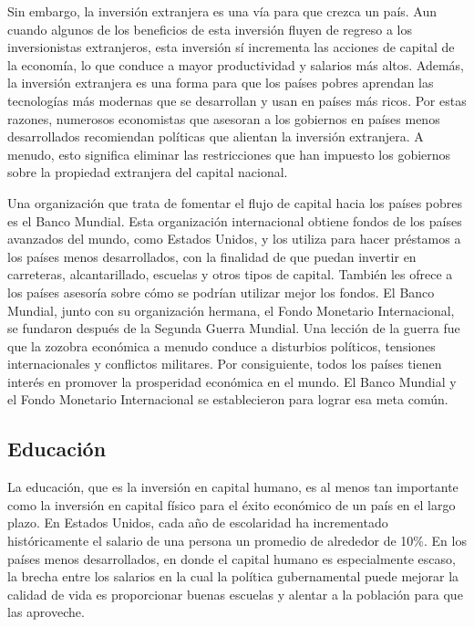 \documentclass[
]{krantz}
\begin{document}
Sin embargo, la inversión extranjera es una vía para que crezca un país. Aun cuando algunos de los beneficios de esta inversión fluyen de regreso a los inversionistas extranjeros, esta inversión sí incrementa las acciones de capital de la economía, lo que conduce a mayor productividad y salarios más altos. Además, la inversión extranjera es una forma para que los países pobres aprendan las tecnologías más modernas que se desarrollan y usan en países más ricos. Por estas razones, numerosos economistas que asesoran a los gobiernos en países menos desarrollados recomiendan políticas que alientan la inversión extranjera. A menudo, esto significa eliminar las restricciones que han impuesto los gobiernos sobre la propiedad extranjera del capital nacional.

Una organización que trata de fomentar el flujo de capital hacia los países pobres es el Banco Mundial. Esta organización internacional obtiene fondos de los países avanzados del mundo, como Estados Unidos, y los utiliza para hacer préstamos a los países menos desarrollados, con la finalidad de que puedan invertir en carreteras, alcantarillado, escuelas y otros tipos de capital. También les ofrece a los países asesoría sobre cómo se podrían utilizar mejor los fondos. El Banco Mundial, junto con su organización hermana, el Fondo Monetario Internacional, se fundaron después de la Segunda Guerra Mundial. Una lección de la guerra fue que la zozobra económica a menudo conduce a disturbios políticos, tensiones internacionales y conflictos militares. Por consiguiente, todos los países tienen interés en promover la prosperidad económica en el mundo. El Banco Mundial y el Fondo Monetario Internacional se establecieron para lograr esa meta común.

\hypertarget{educaciuxf3n}{%
\subsection{Educación}\label{educaciuxf3n}}

La educación, que es la inversión en capital humano, es al menos tan importante como la inversión en capital físico para el éxito económico de un país en el largo plazo. En Estados Unidos, cada año de escolaridad ha incrementado históricamente el salario de una persona un promedio de alrededor de 10\%. En los países menos desarrollados, en donde el capital humano es especialmente escaso, la brecha entre los salarios en la cual la política gubernamental puede mejorar la calidad de vida es proporcionar buenas escuelas y alentar a la población para que las aproveche.
\end{document}
